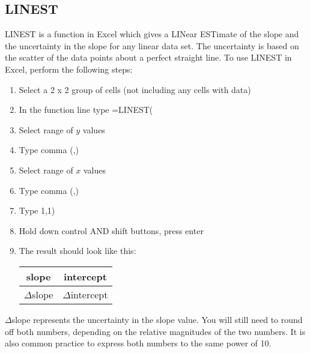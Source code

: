 \subsection{LINEST}

LINEST is a function in Excel which gives a LINear ESTimate of the slope and the uncertainty in the slope for any linear data set. The uncertainty is based on the scatter of the data points about a perfect straight line. To use LINEST in Excel, perform the following steps:

\begin{enumerate}

\item Select a 2 x 2 group of cells (not including any cells with data)
\item In the function line type =LINEST(
\item Select range of $y$ values
\item Type comma (,)
\item Select range of $x$ values
\item Type comma (,)
\item Type 1,1)
\item Hold down control AND shift buttons, press enter
\item The result should look like this:

\begin{center} \begin{tabular}{|c|c|} \hline slope & intercept \\ \hline \( \Delta \)slope & \( \Delta \)intercept \\ \hline \end{tabular} \end{center}

\end{enumerate}

\( \Delta \)slope represents the uncertainty in the slope value. You will still need to round off both numbers, depending on the relative magnitudes of the two numbers. It is also common practice to express both numbers to the same power of 10.

